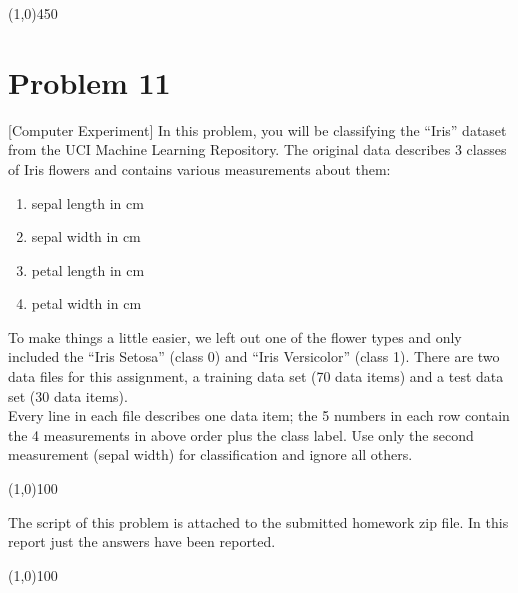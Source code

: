 \documentclass[12pt]{article}
\begin{document}
\begin{center}
\line(1,0){450}
\end{center}


\section{Problem 11}
[Computer Experiment] In this problem, you will be classifying the “Iris” dataset from the UCI Machine Learning Repository. The original data describes 3 classes of Iris flowers and contains various measurements about them: 
\begin{enumerate}
\item sepal length in cm 
\item sepal width in cm
\item petal length in cm 
\item petal width in cm
\end{enumerate}
To make things a little easier, we left out one of the flower types and only included the “Iris Setosa” (class 0) and “Iris Versicolor” (class 1). There are two data files for this assignment, a training data set (70 data items) and a test data set (30 data items). \\

Every line in each file describes one data item; the 5 numbers in each row contain the 4 measurements in above order plus the class label. Use only the second measurement (sepal width) for classification and ignore all others.

\begin{center}
\line(1,0){100}
\end{center}
The script of this problem is attached to the submitted homework zip file. In this report just the answers have been reported.
\begin{center}
\line(1,0){100}
\end{center}
\end{document}
